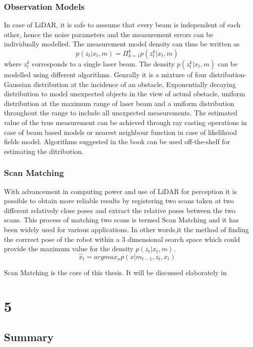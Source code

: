 \subsection{Observation Models}
In case of LiDAR, it is safe to asssume that every beam is independent of each other, hence the noise parameters and the measurement errors can be individually modelled. The measurement model density can
thus be written as 
\begin{equation}
    p(z_t | x_t, m)  = \Pi_{k=1}^k  p(z_t^k | x_t, m)
\end{equation}
where  $z_t^k$ corresponds to a single laser beam. The density $p(z_t^k | x_t, m)$ can be modelled using different algorithms. Genrally it is a mixture of four distribution- Gaussian distribution at the incidence of an obstacle, 
Exponentially decaying distribution to model unexpected objects in the view of actual obstacle, uniform distribution at the maximum range of laser beam and a uniform distribution throughout the range to include all unexpected measurements.
The estimated value of the true measurement can be achieved through ray casting operations in case of beam based models or nearest neighbour function in case of likelihood fields model.
Algorithms suggested in the book \cite{Thrun98aprobabilistic} can be used off-the-shelf for estimating the ditribution.

\subsection{Scan Matching}
    With advancement in computing power and use of
LiDAR for perception it is possible to obtain more reliable results by registering two scans taken at two different relatively close poses and extract the relative poses between the two scans. 
This process of matching two scans is termed Scan Matching and it has been widely used for various applications. In other words,it the method of finding the corrrect pose of the robot within a 3 dimensional
search space which could provide the maximum value for the density $p(z_t | x_t, m)$. 
\begin{equation}
    \hat{x} _{t} = argmax_{x} p(x|m_{t-1}, z_t, x_t)
\end{equation}
\par
Scan Matching is the core of this thesis. It will be discussed elaborately in \chapter{5}

\section{Summary}